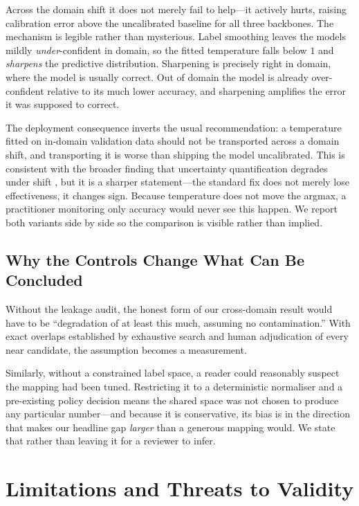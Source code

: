 \documentclass[runningheads]{llncs}
\begin{document}
Across the domain shift it does not merely fail to help---it actively hurts,
raising calibration error above the uncalibrated baseline for all three
backbones. The mechanism is legible rather than mysterious. Label smoothing
leaves the models mildly \emph{under}-confident in domain, so the fitted
temperature falls below $1$ and \emph{sharpens} the predictive distribution.
Sharpening is precisely right in domain, where the model is usually correct.
Out of domain the model is already over-confident relative to its much lower
accuracy, and sharpening amplifies the error it was supposed to correct.

The deployment consequence inverts the usual recommendation: a temperature
fitted on in-domain validation data should not be transported across a domain
shift, and transporting it is worse than shipping the model uncalibrated. This
is consistent with the broader finding that uncertainty quantification degrades
under shift \cite{ovadia2019trust}, but it is a sharper statement---the standard
fix does not merely lose effectiveness, it changes sign. Because temperature
does not move the argmax, a practitioner monitoring only accuracy would never
see this happen. We report both variants side by side so the comparison is
visible rather than implied.

\subsection{Why the Controls Change What Can Be Concluded}

Without the leakage audit, the honest form of our cross-domain result would have
to be ``degradation of at least this much, assuming no contamination.'' With
\NLeakExactCore{} exact overlaps established by exhaustive search and human
adjudication of every near candidate, the assumption becomes a measurement.

Similarly, without a constrained label space, a reader could reasonably suspect
the mapping had been tuned. Restricting it to a deterministic normaliser and a
pre-existing policy decision means the shared space was not chosen to produce
any particular number---and because it is conservative, its bias is in the
direction that makes our headline gap \emph{larger} than a generous mapping
would. We state that rather than leaving it for a reviewer to infer.

\section{Limitations and Threats to Validity}
\label{sec:limitations}
\end{document}
